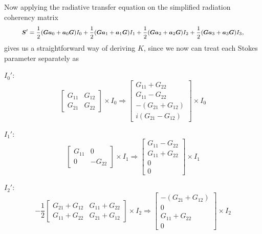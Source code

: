 Now applying the radiative transfer equation on the simplified radiation coherency matrix 
\begin{equation}\footnotesize
\mbox{\boldmath$S$}' = \frac{1}{2}(\mbox{\boldmath$G$}\mbox{\boldmath$a$}_0+\mbox{\boldmath$a$}_0\mbox{\boldmath$G$})I_0 + \frac{1}{2}(\mbox{\boldmath$G$}\mbox{\boldmath$a$}_1+\mbox{\boldmath$a$}_1\mbox{\boldmath$G$})I_1 + \frac{1}{2}(\mbox{\boldmath$G$}\mbox{\boldmath$a$}_2+\mbox{\boldmath$a$}_2\mbox{\boldmath$G$})I_2 + \frac{1}{2}(\mbox{\boldmath$G$}\mbox{\boldmath$a$}_3+\mbox{\boldmath$a$}_3\mbox{\boldmath$G$})I_3,
\end{equation}
gives us a straightforward way of deriving {\boldmath$K$}, since we now can treat each Stokes parameter separately as

$I_0'$:
\begin{equation}\label{eq:zeeman_stokes0}
 \left[
\begin{array}{cc}
G_{11}	&	G_{12}\\
G_{21}	&	G_{22}
\end{array}
\right] \times I_0
 \Rightarrow
\left[
\begin{array}{c}
G_{11}+G_{22}\\
G_{11}-G_{22}\\
-(G_{21}+G_{12})\\
i(G_{21}-G_{12})
\end{array}
\right] \times I_0
\end{equation}

$I_1'$:
\begin{equation}\label{eq:zeeman_stokes1}
 \left[
\begin{array}{cc}
G_{11}	&	0\\
0	&	-G_{22}
\end{array}
\right] \times I_1
 \Rightarrow
\left[
\begin{array}{c}
G_{11}-G_{22}\\
G_{11}+G_{22}\\
0\\
0
\end{array}
\right] \times I_1
\end{equation}

$I_2'$:
\begin{equation}\label{eq:zeeman_stokes2}
 -\frac{1}{2}\left[
\begin{array}{cc}
G_{21}+G_{12}	&	G_{11}+G_{22}\\
G_{11}+G_{22}	&	G_{21}+G_{12}
\end{array}
\right] \times I_2
 \Rightarrow
\left[
\begin{array}{c}
-(G_{21}+G_{12})\\
0\\
G_{11}+G_{22}\\
0
\end{array}
\right] \times I_2
\end{equation}

